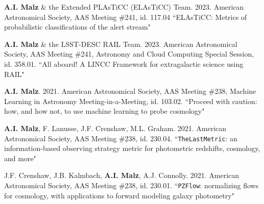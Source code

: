 {}
\nopagebreak\begin{list}{}{\malzlist}


\item {\bf A.I. Malz} \& the Extended PLAsTiCC (ELAsTiCC) Team. 2023. American Astronomical Society, AAS Meeting \#241, id. 117.04 ``ELAsTiCC: Metrics of probabilistic classifications of the alert stream" 

\item {\bf A.I. Malz} \& the LSST-DESC RAIL Team. 2023. American Astronomical Society, AAS Meeting \#241, Astronomy and Cloud Computing Special Session, id. 358.01. ``All aboard! A LINCC Framework for extragalactic science using RAIL" 

\item {\bf A.I. Malz}. 2021. American Astronomical Society, AAS Meeting \#238, Machine Learning in Astronomy Meeting-in-a-Meeting, id. 103.02. ``Proceed with caution: how, and how not, to use machine learning to probe cosmology" 

\item {\bf A.I. Malz}, F. Lanusse, J.F. Crenshaw, M.L. Graham. 2021. American Astronomical Society, AAS Meeting \#238, id. 230.04. ``\texttt{TheLastMetric}: an information-based observing strategy metric for photometric redshifts, cosmology, and more" 

\item J.F. Crenshaw, J.B. Kalmbach, {\bf A.I. Malz}, A.J. Connolly. 2021. American Astronomical Society, AAS Meeting \#238, id. 230.01. ``\texttt{PZFlow}: normalizing flows for cosmology, with applications to forward modeling galaxy photometry" 


\end{list}
